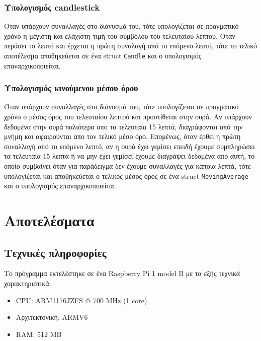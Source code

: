 \documentclass[11pt]{article}
\begin{document}
\subsubsection{Υπολογισμός candlestick}
\label{sec:orge2c3ffa}
Όταν υπάρχουν συναλλαγές στο διάνυσμά του, τότε υπολογίζεται σε πραγματικό χρόνο η μέγιστη και ελάχιστη τιμή του συμβόλου του τελευταίου λεπτού. Όταν περάσει το λεπτό και έρχεται η πρώτη συναλαγή από το επόμενο λεπτό, τότε το τελικό αποτέλεσμα αποθηκεύεται σε ένα struct \texttt{Candle} και ο υπολογισμός επαναρχικοποιείται.
\pagebreak
\subsubsection{Υπολογισμός κινούμενου μέσου όρου}
\label{sec:orgbfb1496}
Όταν υπάρχουν συναλλαγές στο διάνυσμά του, τότε υπολογίζεται σε πραγματικό χρόνο ο μέσος όρος του τελευταίου λεπτού και προστίθεται στην ουρά. Αν υπάρχουν δεδομένα στην ουρά παλιότερα απο τα τελευταία 15 λεπτά, διαγράφονται από την μνήμη και αφαιρούνται απο τον τελικό μέσο όρο. Επομένως, όταν έρθει η πρώτη συναλλαγή από το επόμενο λεπτό, αν η ουρά έχει γεμίσει επειδή έχουμε συμπληρώσει τα τελευταία 15 λεπτά ή να μην έχει γεμίσει έχουμε διαγράψει δεδομένα από αυτή, το οποίο συμβαίνει όταν για παράδειγμα δεν έχουμε συναλλαγές για κάποια λεπτά, τότε υπολογίζεται και αποθηκεύεται ο τελικός μέσος όρος σε ένα struct \texttt{MovingAverage} και ο υπολογισμός επαναρχικοποιείται.

\section{Αποτελέσματα}
\label{sec:org7846eff}
\subsection{Τεχνικές πληροφορίες}
\label{sec:org383662d}
Το πρόγραμμα εκτελέστηκε σε ένα Raspberry Pi 1 model B με τα εξής τεχνικά χαρακτηριστικά:
\begin{itemize}
\item CPU: ARM1176JZFS @ 700 MHz (1 core)
\item Αρχιτεκτονική: ARMV6
\item RAM: 512 MB
\end{itemize}
\end{document}

